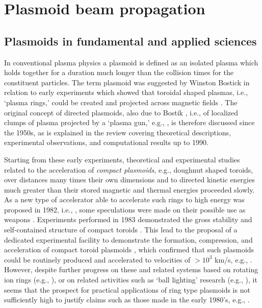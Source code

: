 \documentclass [12pt,a4paper,     ]{report} %
\begin{document}
\chapter{Plasmoid beam propagation}
\label{plb:0}



\section{Plasmoids in fundamental and applied sciences}
\label{pfa:0}

In conventional plasma physics a plasmoid is defined as an isolated plasma which holds together for a duration much longer than the collision times for the constituent particles.  The term plasmoid was suggested by  Winston Bostick in relation to early experiments which showed that toroidal shaped plasmas, i.e., `plasma rings,' could be created and projected across magnetic fields \cite{BOSTI1956-}.  The original concept of directed plasmoids, also due to Bostik \cite{BOSTI1956-}, i.e., of localized clumps of plasma projected by a `plasma gun,' e.g., \cite{MARSH1960-,ARETO1965-}, is therefore discussed since the 1950s, as is explained in the review \cite{WESSE1990-} covering theoretical descriptions, experimental observations, and computational results up to 1990. 

   Starting from these early experiments, theoretical and experimental studies related to the acceleration of \emph{compact plasmoids}, e.g., doughnut shaped toroids, over distances many times their own dimensions and to directed kinetic energies much greater than their stored magnetic and thermal energies proceeded slowly.  As a new type of accelerator able to accelerate such rings to high energy was proposed in 1982, i.e., \cite{HARTM1982-}, some speculations were made on their possible use as weapons \cite{BRADN1982-}.
 Experiments performed in 1983 demonstrated the gross stability and self-contained structure of compact toroids \cite{TURNE1983-}.  This lead to the proposal of a dedicated experimental facility to demonstrate the formation, compression, and acceleration of compact toroid plasmoids \cite{HARTM1984-}, which confirmed that such plasmoids could be routinely produced and accelerated to velocities of $>10^3$ km/s, e.g., \cite{PARKS1988-}. However, despite further progress on these and related systems based on rotating ion rings (e.g., \cite{KAPET1980-,SCHAM1993-,OLIVE1994-}), or on related activities such as `ball lighting' research (e.g., \cite{GILMA2003-, SHMAT2004-}), it seems that the prospect for practical applications of ring type plasmoids is not sufficiently high to justify claims such as those made in the early 1980's, e.g., \cite{BRADN1982-}.
\end{document}
